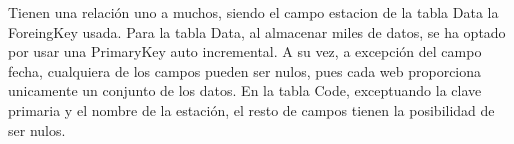 Tienen una relación uno a muchos, siendo el campo estacion de la tabla Data la ForeingKey usada.\newline
\newline
Para la tabla Data, al almacenar miles de datos, se ha optado por usar una PrimaryKey auto incremental. A su vez, a excepción del campo fecha, cualquiera de los campos pueden ser nulos, pues cada web proporciona unicamente un conjunto de los datos.\newline
\newline
En la tabla Code, exceptuando la clave primaria y el nombre de la estación, el resto de campos tienen la posibilidad de ser nulos.
